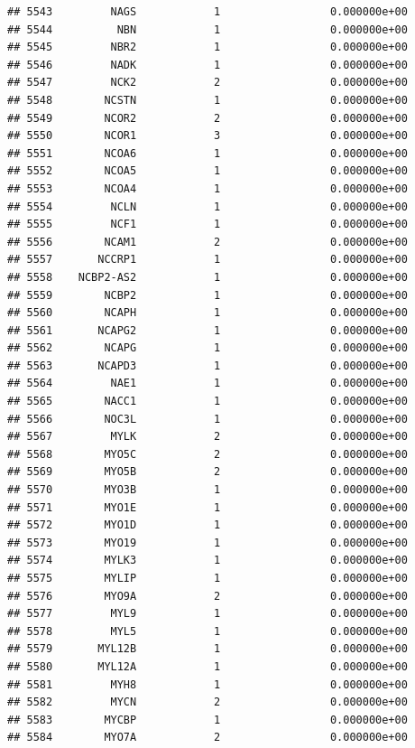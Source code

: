 \documentclass[
]{article}
\begin{document}
\begin{verbatim}
## 5543         NAGS            1                 0.000000e+00
## 5544          NBN            1                 0.000000e+00
## 5545         NBR2            1                 0.000000e+00
## 5546         NADK            1                 0.000000e+00
## 5547         NCK2            2                 0.000000e+00
## 5548        NCSTN            1                 0.000000e+00
## 5549        NCOR2            2                 0.000000e+00
## 5550        NCOR1            3                 0.000000e+00
## 5551        NCOA6            1                 0.000000e+00
## 5552        NCOA5            1                 0.000000e+00
## 5553        NCOA4            1                 0.000000e+00
## 5554         NCLN            1                 0.000000e+00
## 5555         NCF1            1                 0.000000e+00
## 5556        NCAM1            2                 0.000000e+00
## 5557       NCCRP1            1                 0.000000e+00
## 5558    NCBP2-AS2            1                 0.000000e+00
## 5559        NCBP2            1                 0.000000e+00
## 5560        NCAPH            1                 0.000000e+00
## 5561       NCAPG2            1                 0.000000e+00
## 5562        NCAPG            1                 0.000000e+00
## 5563       NCAPD3            1                 0.000000e+00
## 5564         NAE1            1                 0.000000e+00
## 5565        NACC1            1                 0.000000e+00
## 5566        NOC3L            1                 0.000000e+00
## 5567         MYLK            2                 0.000000e+00
## 5568        MYO5C            2                 0.000000e+00
## 5569        MYO5B            2                 0.000000e+00
## 5570        MYO3B            1                 0.000000e+00
## 5571        MYO1E            1                 0.000000e+00
## 5572        MYO1D            1                 0.000000e+00
## 5573        MYO19            1                 0.000000e+00
## 5574        MYLK3            1                 0.000000e+00
## 5575        MYLIP            1                 0.000000e+00
## 5576        MYO9A            2                 0.000000e+00
## 5577         MYL9            1                 0.000000e+00
## 5578         MYL5            1                 0.000000e+00
## 5579       MYL12B            1                 0.000000e+00
## 5580       MYL12A            1                 0.000000e+00
## 5581         MYH8            1                 0.000000e+00
## 5582         MYCN            2                 0.000000e+00
## 5583        MYCBP            1                 0.000000e+00
## 5584        MYO7A            2                 0.000000e+00

\end{verbatim}
\end{document}
